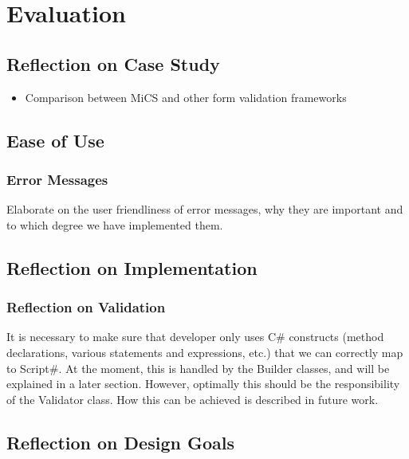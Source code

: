 \chapter{Evaluation}

\section{Reflection on Case Study} %
\label{sec:reflection_on_case_study}
\begin{itemize}
	\item Comparison between MiCS and other form validation frameworks
\end{itemize}

\section{Ease of Use} %
\label{sec:ease_of_use}

	\subsection{Error Messages} %
	\label{sub:error_messages}
		Elaborate on the user friendliness of error messages, why they are important
		and to which degree we have implemented them.	


\section{Reflection on Implementation} %
\label{sec:reflection_on_implementation}
\subsection{Reflection on Validation} %
\label{sub:reflection_on_validation}
It is necessary to make sure that developer only uses C\# constructs (method declarations, various statements and expressions, etc.) that we can correctly map to Script\#. At the moment, this is handled by the Builder classes, and will be explained in a later section. However, optimally this should be the responsibility of the Validator class. How this can be achieved is described in future work.

\section{Reflection on Design Goals} %
\label{sec:reflection_on_design_goals}

